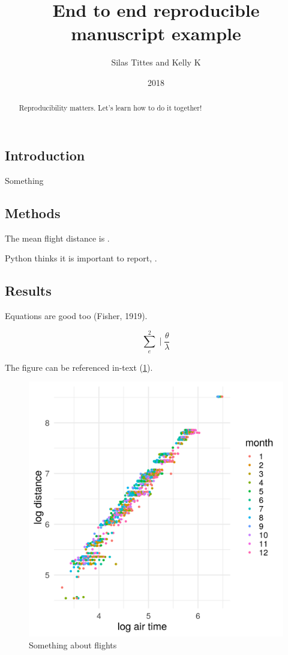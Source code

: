 \documentclass[12pt,a4paper,]{article}
\title{End to end reproducible manuscript example}
\author{Silas Tittes and Kelly K}
\date{2018}
\begin{document}
\maketitle
\begin{abstract}
Reproducibility matters. Let's learn how to do it together!
\end{abstract}

\subsection{Introduction}\label{introduction}

Something

\subsection{Methods}\label{methods}

The mean flight distance is \meandistance{}.

\noindent
Python thinks it is important to report, \pyvar{}.

\subsection{Results}\label{results}

Equations are good too (Fisher, 1919).

\[\sum_{e}^{2} \mid \frac{\theta}{\lambda}\]

The figure can be referenced in-text (\ref{fig:flight}).

\begin{figure}
\centering
\includegraphics{flight.png}
\caption{Something about flights\label{fig:flight}}
\end{figure}
\end{document}

